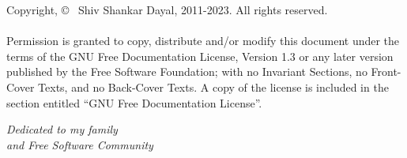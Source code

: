 \documentclass[9pt, oneside, b5paper]{memoir}
\title{\sffamily\color{cyan}\HUGE{\textbf{A Variable in Algebra}}}
\author{\vspace*{1cm}\LARGE{Shiv S. Dayal}}
\date{}
\begin{document}
\minitoc
\minilof
\minilot
\maketitle
\thispagestyle{empty}
\pagestyle{empty}
\vfill
\newpage
\vspace*{6in}
Copyright, \copyright~ Shiv Shankar Dayal, 2011-2023. All rights reserved.\\\\
Permission is granted to copy, distribute and/or modify this document under the
terms of the GNU Free Documentation License, Version 1.3 or any later version
published by the Free Software Foundation; with no Invariant Sections, no
Front-Cover Texts, and no Back-Cover Texts. A copy of the license is included
in the section entitled ``GNU Free Documentation License''.
\newpage
\vspace*{2in}
\begin{center}
  \Large \it Dedicated to my family\\and Free Software Community
\end{center}
\newpage
\setcounter{page}{1}
\tableofcontents
\newpage
\listoffigures
\newpage
\listoftables
\newpage
\pagestyle{fancy}
\frontmatter
\setcounter{page}{1}

\newpage
\mainmatter
{}

\backmatter

\printindex
\end{document}
